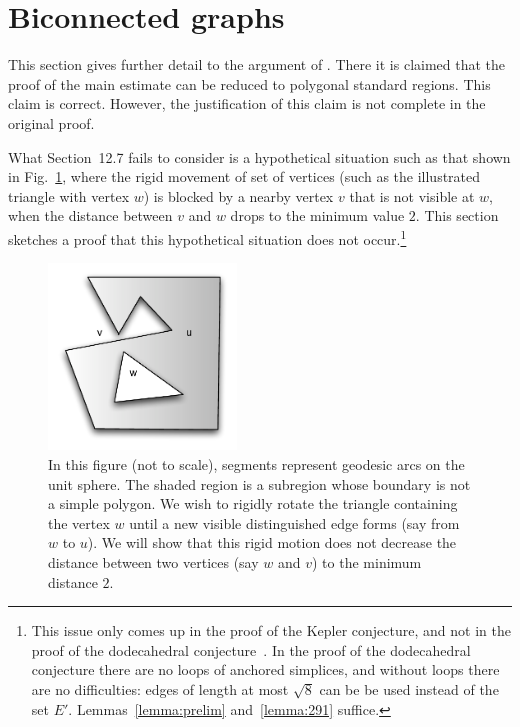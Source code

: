 \documentclass[11pt]{amsart}
\begin{document}
\section{Biconnected graphs}


This section gives further detail to the argument of \cite[Sec.12.7~p.131]{Hales:2006:DCG}.  There it is claimed that
the proof of the main estimate \cite[Theorem~12.1]{Hales:2006:DCG} can be reduced to polygonal standard regions.
This claim is correct. 
However, the justification of this claim is not complete in the original proof. 

What Section~12.7 fails to consider
is a hypothetical situation such as that shown in Fig.~\ref{fig:biconnected}, where the rigid movement of set of vertices (such as the illustrated triangle with vertex $w$)
is blocked by a nearby vertex $v$ that is not visible at $w$, when the distance between $v$ and $w$ drops
to the minimum value $2$.  This section sketches a proof that this hypothetical situation does
not occur.\footnote{This issue only comes up in the proof of the Kepler conjecture, and not
in the proof of the dodecahedral conjecture~\cite{Hales:2008:Dodec}.  In the proof of the dodecahedral conjecture there are no loops of anchored simplices, and without loops there are no difficulties: edges of length at most
$\sqrt8$ can be be used instead of the set $E'$.  Lemmas~\ref{lemma:prelim} and~\ref{lemma:291} suffice.}  



\begin{figure}
\begin{center}
\includegraphics[width=5cm]{biconnected}
\end{center}
\caption{In this figure (not to scale), segments represent geodesic arcs on the unit sphere.  The shaded region is a subregion whose boundary is not a simple polygon.
We wish to rigidly rotate the triangle containing the vertex $w$ until a new visible distinguished edge forms
(say from $w$ to $u$).  We will show that this rigid motion does not decrease the distance between
two vertices (say $w$ and $v$)  to the minimum distance $2$.}
\label{fig:biconnected}
\end{figure}
\end{document}
